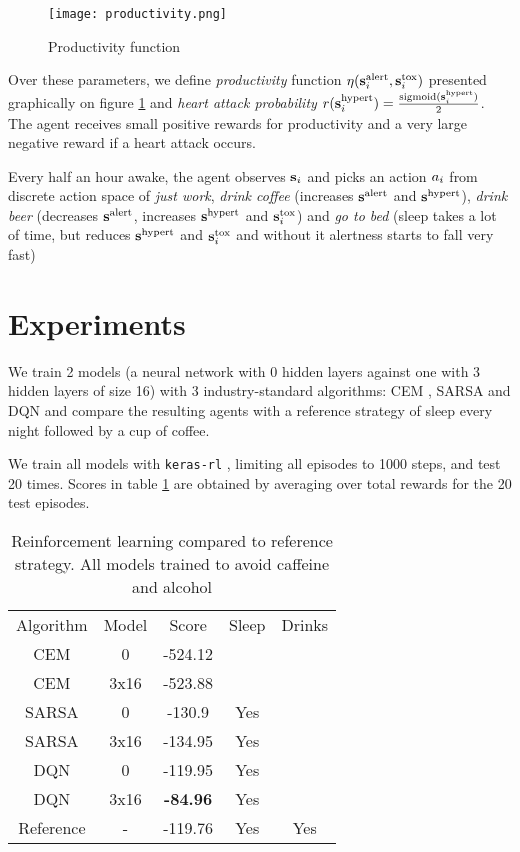 \begin{figure}
    \centering
    \texttt{[image: productivity.png]}
    \caption{Productivity function}
    \label{fig:productivity}
\end{figure}

Over these parameters, we define \emph{productivity} function $\eta(\textbf{s}^\text{alert}_i, \textbf{s}^\text{tox}_i)$ presented graphically on figure \ref{fig:productivity} and \emph{heart attack probability} $r(\textbf{s}^\text{hypert}_i)=\frac{\text{sigmoid}(\textbf{s}^\text{hypert}_i)}{2}$.
The agent receives small positive rewards for productivity and a very large negative reward if a heart attack occurs.

Every half an hour awake, the agent observes $\textbf{s}_i$ and picks an action $a_i$ from discrete action space of \emph{just work}, \emph{drink coffee} (increases $\textbf{s}^\text{alert}$ and $\textbf{s}^\text{hypert}$), \emph{drink beer} (decreases $\textbf{s}^\text{alert}$, increases $\textbf{s}^\text{hypert}$ and $\textbf{s}^\text{tox}_i$) and \emph{go to bed} (sleep takes a lot of time, but reduces $\textbf{s}^\text{hypert}$ and $\textbf{s}^\text{tox}_i$ and without it alertness starts to fall very fast)

\section{Experiments}
\label{sec:heartpole-experiments}


We train 2 models (a neural network with 0 hidden layers against one with 3 hidden layers of size 16) with 3 industry-standard algorithms: CEM \cite{cem}, SARSA \cite[Chapter 6]{thebook} and DQN \cite{dqn1,dqn2} and compare the resulting agents with a reference strategy of sleep every night followed by a cup of coffee.

We train all models with \texttt{keras-rl} \cite{kerasrl}, limiting all episodes to 1000 steps, and test 20 times.
Scores in table \ref{tab:heartpole-results} are obtained by averaging over total rewards for the 20 test episodes.

\begin{table}[]
    \centering
    \begin{tabular}{c|c|c|c|c}
         Algorithm & Model & Score & Sleep & Drinks \\
         CEM & 0 & -524.12 &  &   \\
         CEM & 3x16 & -523.88 & & \\
         SARSA & 0 & -130.9 & Yes & \\
         SARSA & 3x16 & -134.95 & Yes & \\
         DQN & 0 & -119.95 & Yes &  \\
         DQN & 3x16 & \textbf{-84.96} & Yes &  \\
         Reference & - & -119.76 & Yes & Yes 
    \end{tabular}
    \caption{Reinforcement learning compared to reference strategy. All models trained to avoid caffeine and alcohol}
    \label{tab:heartpole-results}
\end{table}

